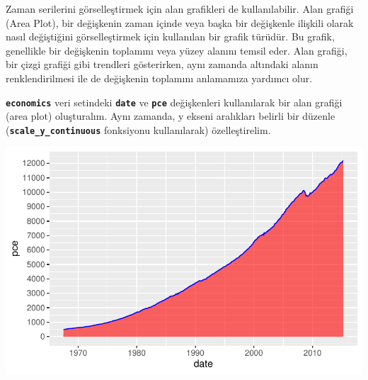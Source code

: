 \documentclass[
  letterpaper,
  DIV=11,
  numbers=noendperiod]{scrreprt}
\newenvironment{Shaded}{\begin{snugshade}}{\end{snugshade}}
\newcommand{\AttributeTok}[1]{\textcolor[rgb]{0.40,0.45,0.13}{#1}}
\newcommand{\CommentTok}[1]{\textcolor[rgb]{0.37,0.37,0.37}{#1}}
\newcommand{\DecValTok}[1]{\textcolor[rgb]{0.68,0.00,0.00}{#1}}
\newcommand{\FloatTok}[1]{\textcolor[rgb]{0.68,0.00,0.00}{#1}}
\newcommand{\FunctionTok}[1]{\textcolor[rgb]{0.28,0.35,0.67}{#1}}
\newcommand{\NormalTok}[1]{\textcolor[rgb]{0.00,0.23,0.31}{#1}}
\newcommand{\SpecialCharTok}[1]{\textcolor[rgb]{0.37,0.37,0.37}{#1}}
\newcommand{\StringTok}[1]{\textcolor[rgb]{0.13,0.47,0.30}{#1}}
\begin{document}
Zaman serilerini görselleştirmek için alan grafikleri de kullanılabilir.
Alan grafiği (Area Plot), bir değişkenin zaman içinde veya başka bir
değişkenle ilişkili olarak nasıl değiştiğini görselleştirmek için
kullanılan bir grafik türüdür. Bu grafik, genellikle bir değişkenin
toplamını veya yüzey alanını temsil eder. Alan grafiği, bir çizgi
grafiği gibi trendleri gösterirken, aynı zamanda altındaki alanın
renklendirilmesi ile de değişkenin toplamını anlamamıza yardımcı olur.

\textbf{\texttt{economics}} veri setindeki \textbf{\texttt{date}} ve
\textbf{\texttt{pce}} değişkenleri kullanılarak bir alan grafiği (area
plot) oluşturalım. Aynı zamanda, y ekseni aralıkları belirli bir düzenle
(\textbf{\texttt{scale\_y\_continuous}} fonksiyonu kullanılarak)
özelleştirelim.

\begin{Shaded}
\end{Shaded}

\includegraphics{ggplot2_files/figure-pdf/unnamed-chunk-25-1.pdf}
\end{document}
